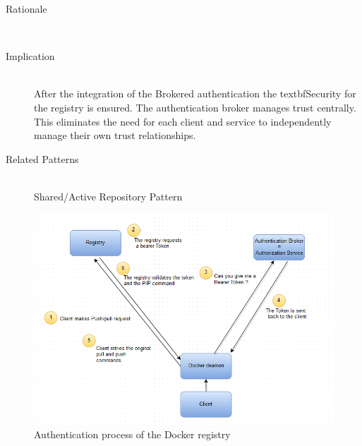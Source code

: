 \begin{description}

\item[Rationale]~\\ 

\item[Implication]~\\ After the integration of the Brokered authentication the textbf{Security} for the registry is ensured. %
The authentication broker manages trust centrally. This eliminates the need for each client and service to independently manage their own trust relationships.

\item [Related Patterns]~\\
Shared/Active Repository Pattern

\end{description}

\begin{figure}[H]
\centering
\includegraphics[scale=0.7]{5-patterns/images/Authentication.png}
\caption{Authentication process of the Docker registry }
\label{fig:auth-process}
\end{figure}

